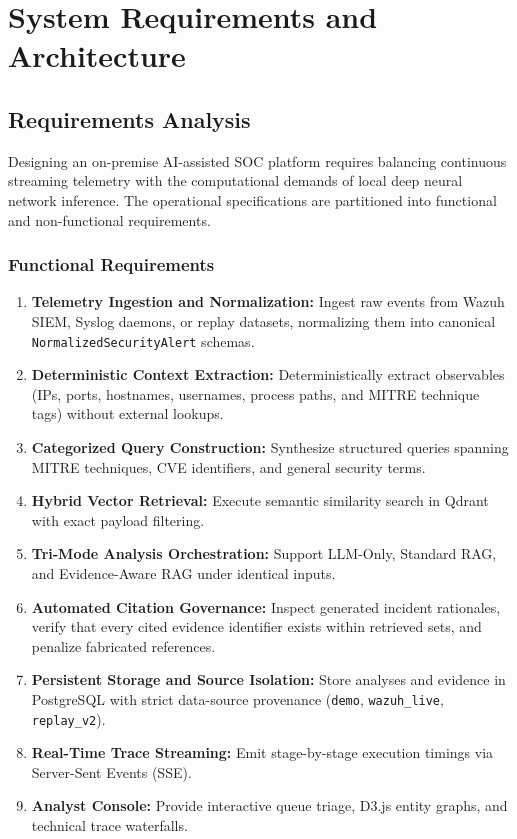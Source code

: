 \chapter{System Requirements and Architecture}
\label{ch:architecture}

\section{Requirements Analysis}
\label{sec:requirements_analysis}
Designing an on-premise AI-assisted SOC platform requires balancing continuous streaming telemetry with the computational demands of local deep neural network inference. The operational specifications are partitioned into functional and non-functional requirements.

\subsection{Functional Requirements}
\begin{enumerate}[itemsep=1pt,topsep=2pt]
  \item \textbf{Telemetry Ingestion and Normalization:} Ingest raw events from Wazuh SIEM, Syslog daemons, or replay datasets, normalizing them into canonical \texttt{NormalizedSecurityAlert} schemas.
  \item \textbf{Deterministic Context Extraction:} Deterministically extract observables (IPs, ports, hostnames, usernames, process paths, and MITRE technique tags) without external lookups.
  \item \textbf{Categorized Query Construction:} Synthesize structured queries spanning MITRE techniques, CVE identifiers, and general security terms.
  \item \textbf{Hybrid Vector Retrieval:} Execute semantic similarity search in Qdrant with exact payload filtering.
  \item \textbf{Tri-Mode Analysis Orchestration:} Support LLM-Only, Standard RAG, and Evidence-Aware RAG under identical inputs.
  \item \textbf{Automated Citation Governance:} Inspect generated incident rationales, verify that every cited evidence identifier exists within retrieved sets, and penalize fabricated references.
  \item \textbf{Persistent Storage and Source Isolation:} Store analyses and evidence in PostgreSQL with strict data-source provenance (\texttt{demo}, \texttt{wazuh\_live}, \texttt{replay\_v2}).
  \item \textbf{Real-Time Trace Streaming:} Emit stage-by-stage execution timings via Server-Sent Events (SSE).
  \item \textbf{Analyst Console:} Provide interactive queue triage, D3.js entity graphs, and technical trace waterfalls.
\end{enumerate}

